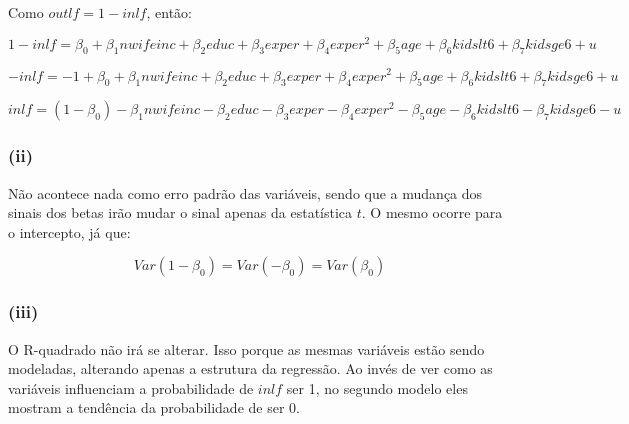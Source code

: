 \documentclass[hidelinks,11pt]{book}
\theoremstyle{definition}
\begin{document}
Como $outlf = 1 - inlf$, então:

\begin{displaymath}
	1 - inlf = \beta_0 + \beta_1 nwifeinc + \beta_2 educ + \beta_3 exper + \beta_4 exper^2 + \beta_5 age + \beta_6 kidslt6 + \beta_7 kidsge6 + u
\end{displaymath}

\begin{displaymath}
	- inlf = -1 + \beta_0 + \beta_1 nwifeinc + \beta_2 educ + \beta_3 exper + \beta_4 exper^2 + \beta_5 age + \beta_6 kidslt6 + \beta_7 kidsge6 + u
\end{displaymath}

\begin{displaymath}
	inlf = (1 - \beta_0) - \beta_1 nwifeinc - \beta_2 educ - \beta_3 exper - \beta_4 exper^2 - \beta_5 age - \beta_6 kidslt6 - \beta_7 kidsge6 - u
\end{displaymath}

\subsubsection*{(ii)}

Não acontece nada como erro padrão das variáveis, sendo que a mudança dos sinais dos betas irão mudar o sinal apenas da estatística $t$. O mesmo ocorre para o intercepto, já que:

\begin{displaymath}
	Var(1 - \beta_0) = Var(-\beta_0) = Var(\beta_0)
\end{displaymath}

\subsubsection*{(iii)}

O R-quadrado não irá se alterar. Isso porque as mesmas variáveis estão sendo modeladas, alterando apenas a estrutura da regressão. Ao invés de ver como as variáveis influenciam a probabilidade de $inlf$ ser 1, no segundo modelo eles mostram a tendência da probabilidade de ser 0.
	
\end{document}
